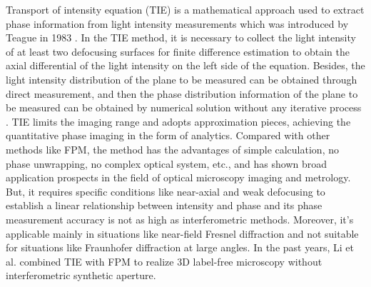 \documentclass[journal,review,submit,pdftex,moreauthors]{Definitions/mdpi}
\begin{document}
Transport of intensity equation (TIE) is a mathematical approach used to extract phase information from light intensity measurements which was introduced by Teague in 1983 \cite{ teague1982irradiance,teague1983deterministic}. In the TIE method, it is necessary to collect the light intensity of at least two defocusing surfaces for finite difference estimation to obtain the axial differential of the light intensity on the left side of the equation. Besides, the light intensity distribution of the plane to be measured can be obtained through direct measurement, and then the phase distribution information of the plane to be measured can be obtained by numerical solution without any iterative process \cite{paganin1998noninterferometric}. TIE limits the imaging range and adopts approximation pieces, achieving the quantitative phase imaging in the form of analytics. Compared with other methods like FPM, the method has the advantages of simple calculation, no phase unwrapping, no complex optical system, etc., and has shown broad application prospects in the field of optical microscopy imaging and metrology\cite{ zuo2020transport}. But, it requires specific conditions like near-axial and weak defocusing to establish a linear relationship between intensity and phase and its phase measurement accuracy is not as high as interferometric methods. Moreover, it's applicable mainly in situations like near-field Fresnel diffraction and not suitable for situations like Fraunhofer diffraction at large angles. In the past years, Li et al. combined TIE with FPM to realize 3D label-free microscopy without interferometric synthetic aperture\cite{li2022transport}.
\end{document}
